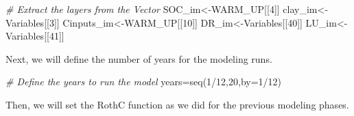 \documentclass[
  10pt,
  b5paper,
]{book}
\newenvironment{Shaded}{\begin{snugshade}}{\end{snugshade}}
\newcommand{\AttributeTok}[1]{\textcolor[rgb]{0.77,0.63,0.00}{#1}}
\newcommand{\CommentTok}[1]{\textcolor[rgb]{0.56,0.35,0.01}{\textit{#1}}}
\newcommand{\DecValTok}[1]{\textcolor[rgb]{0.00,0.00,0.81}{#1}}
\newcommand{\FunctionTok}[1]{\textcolor[rgb]{0.00,0.00,0.00}{#1}}
\newcommand{\NormalTok}[1]{#1}
\newcommand{\OtherTok}[1]{\textcolor[rgb]{0.56,0.35,0.01}{#1}}
\newcommand{\SpecialCharTok}[1]{\textcolor[rgb]{0.00,0.00,0.00}{#1}}
\begin{document}
\begin{Shaded}
\begin{Highlighting}[]
\CommentTok{\# Extract the layers from the Vector}
\NormalTok{SOC\_im}\OtherTok{\textless{}{-}}\NormalTok{WARM\_UP[[}\DecValTok{4}\NormalTok{]]}
\NormalTok{clay\_im}\OtherTok{\textless{}{-}}\NormalTok{Variables[[}\DecValTok{3}\NormalTok{]] }
\NormalTok{Cinputs\_im}\OtherTok{\textless{}{-}}\NormalTok{WARM\_UP[[}\DecValTok{10}\NormalTok{]] }
\NormalTok{DR\_im}\OtherTok{\textless{}{-}}\NormalTok{Variables[[}\DecValTok{40}\NormalTok{]]}
\NormalTok{LU\_im}\OtherTok{\textless{}{-}}\NormalTok{Variables[[}\DecValTok{41}\NormalTok{]]}
\end{Highlighting}
\end{Shaded}

Next, we will define the number of years for the modeling runs.

\begin{Shaded}
\begin{Highlighting}[]
\CommentTok{\# Define the years to run the model}
\NormalTok{years}\OtherTok{=}\FunctionTok{seq}\NormalTok{(}\DecValTok{1}\SpecialCharTok{/}\DecValTok{12}\NormalTok{,}\DecValTok{20}\NormalTok{,}\AttributeTok{by=}\DecValTok{1}\SpecialCharTok{/}\DecValTok{12}\NormalTok{)}
\end{Highlighting}
\end{Shaded}

Then, we will set the RothC function as we did for the previous modeling phases.
\end{document}
